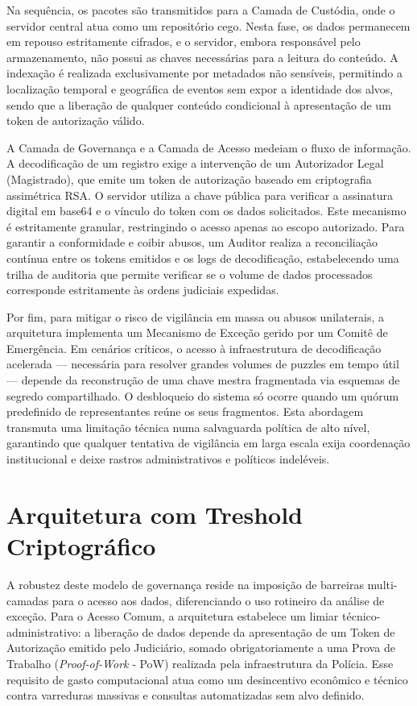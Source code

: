 Na sequência, os pacotes são transmitidos para a Camada de Custódia, onde o servidor central atua como um repositório cego. Nesta fase, os dados permanecem em repouso estritamente cifrados, e o servidor, embora responsável pelo armazenamento, não possui as chaves necessárias para a leitura do conteúdo. A indexação é realizada exclusivamente por metadados não sensíveis, permitindo a localização temporal e geográfica de eventos sem expor a identidade dos alvos, sendo que a liberação de qualquer conteúdo condicional à apresentação de um token de autorização válido.

A Camada de Governança e a Camada de Acesso medeiam o fluxo de informação. A decodificação de um registro exige a intervenção de um Autorizador Legal (Magistrado), que emite um token de autorização baseado em criptografia assimétrica RSA. O servidor utiliza a chave pública para verificar a assinatura digital em base64 e o vínculo do token com os dados solicitados. Este mecanismo é estritamente granular, restringindo o acesso apenas ao escopo autorizado. Para garantir a conformidade e coibir abusos, um Auditor realiza a reconciliação contínua entre os tokens emitidos e os logs de decodificação, estabelecendo uma trilha de auditoria que permite verificar se o volume de dados processados corresponde estritamente às ordens judiciais expedidas.

Por fim, para mitigar o risco de vigilância em massa ou abusos unilaterais, a arquitetura implementa um Mecanismo de Exceção gerido por um Comitê de Emergência. Em cenários críticos, o acesso à infraestrutura de decodificação acelerada — necessária para resolver grandes volumes de puzzles em tempo útil — depende da reconstrução de uma chave mestra fragmentada via esquemas de segredo compartilhado. O desbloqueio do sistema só ocorre quando um quórum predefinido de representantes reúne os seus fragmentos. Esta abordagem transmuta uma limitação técnica numa salvaguarda política de alto nível, garantindo que qualquer tentativa de vigilância em larga escala exija coordenação institucional e deixe rastros administrativos e políticos indeléveis.

\section{Arquitetura com Treshold Criptográfico}
A robustez deste modelo de governança reside na imposição de barreiras multi-camadas para o acesso aos dados, diferenciando o uso rotineiro da análise de exceção. Para o Acesso Comum, a arquitetura estabelece um limiar técnico-administrativo: a liberação de dados depende da apresentação de um Token de Autorização emitido pelo Judiciário, somado obrigatoriamente a uma Prova de Trabalho (\textit{Proof-of-Work} - PoW) realizada pela infraestrutura da Polícia. Esse requisito de gasto computacional atua como um desincentivo econômico e técnico contra varreduras massivas e consultas automatizadas sem alvo definido.

